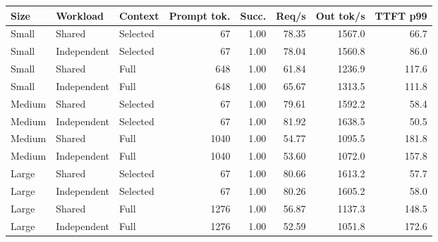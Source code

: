\begin{tabular}{lllrrrrr}
\toprule
Size & Workload & Context & Prompt tok. & Succ. & Req/s & Out tok/s & TTFT p99 \\
\midrule
Small & Shared & Selected & 67 & 1.00 & 78.35 & 1567.0 & 66.7 \\
Small & Independent & Selected & 67 & 1.00 & 78.04 & 1560.8 & 86.0 \\
Small & Shared & Full & 648 & 1.00 & 61.84 & 1236.9 & 117.6 \\
Small & Independent & Full & 648 & 1.00 & 65.67 & 1313.5 & 111.8 \\
Medium & Shared & Selected & 67 & 1.00 & 79.61 & 1592.2 & 58.4 \\
Medium & Independent & Selected & 67 & 1.00 & 81.92 & 1638.5 & 50.5 \\
Medium & Shared & Full & 1040 & 1.00 & 54.77 & 1095.5 & 181.8 \\
Medium & Independent & Full & 1040 & 1.00 & 53.60 & 1072.0 & 157.8 \\
Large & Shared & Selected & 67 & 1.00 & 80.66 & 1613.2 & 57.7 \\
Large & Independent & Selected & 67 & 1.00 & 80.26 & 1605.2 & 58.0 \\
Large & Shared & Full & 1276 & 1.00 & 56.87 & 1137.3 & 148.5 \\
Large & Independent & Full & 1276 & 1.00 & 52.59 & 1051.8 & 172.6 \\
\bottomrule
\end{tabular}
